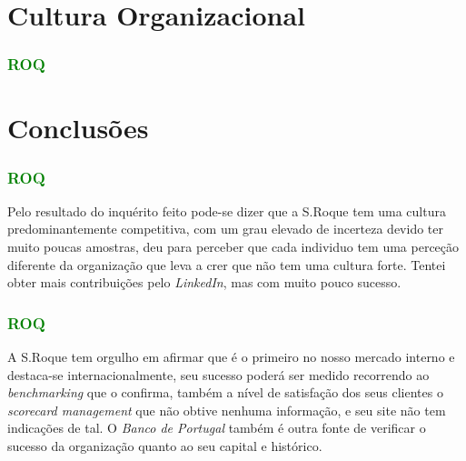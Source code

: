 \section{Cultura Organizacional}
\begin{frame}
\frametitle{\textcolor{green}{ROQ}}









\end{frame}
\section{Conclusões}
\begin{frame}
\frametitle{\textcolor{green}{ROQ}}
Pelo resultado do inquérito feito pode-se dizer que a S.Roque tem uma cultura predominantemente
competitiva, com um grau elevado de incerteza devido ter muito poucas amostras, deu para perceber que
cada individuo tem uma perceção diferente da organização que leva a crer que não tem uma cultura forte.
Tentei obter mais contribuições pelo \textit{LinkedIn}, mas com muito pouco sucesso.
\end{frame}
\begin{frame}
\frametitle{\textcolor{green}{ROQ}}
A S.Roque tem orgulho em afirmar que é o primeiro no nosso mercado interno e destaca-se internacionalmente,
seu sucesso poderá ser medido recorrendo ao \textit{benchmarking} que o confirma, também a nível de satisfação
dos seus clientes o \textit{scorecard management} que não obtive nenhuma informação, e seu site não tem indicações de tal. O \textit{Banco de Portugal} também é outra fonte de verificar o sucesso da organização quanto ao seu
capital e histórico.
\end{frame}

